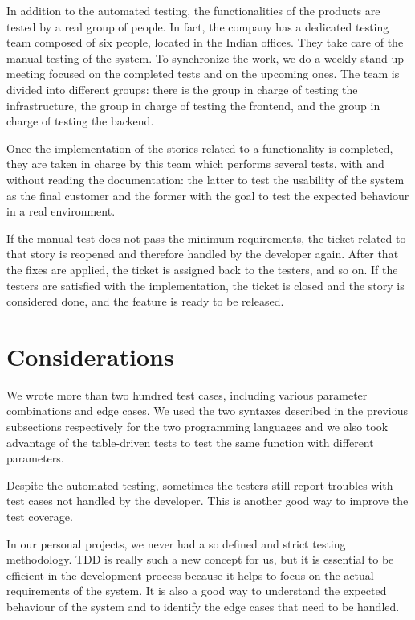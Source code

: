 In addition to the automated testing, the functionalities of the products are tested by a real group of people. In fact, the company has a dedicated testing team composed of six people, located in the Indian offices. They take care of the manual testing of the system. To synchronize the work, we do a weekly stand-up meeting focused on the completed tests and on the upcoming ones. The team is divided into different groups: there is the group in charge of testing the infrastructure, the group in charge of testing the frontend, and the group in charge of testing the backend.

Once the implementation of the stories related to a functionality is completed, they are taken in charge by this team which performs several tests, with and without reading the documentation: the latter to test the usability of the system as the final customer and the former with the goal to test the expected behaviour in a real environment.

If the manual test does not pass the minimum requirements, the ticket related to that story is reopened and therefore handled by the developer again. After that the fixes are applied, the ticket is assigned back to the testers, and so on. If the testers are satisfied with the implementation, the ticket is closed and the story is considered done, and the feature is ready to be released.

\section{Considerations}

We wrote more than two hundred test cases, including various parameter combinations and edge cases. We used the two syntaxes described in the previous subsections respectively for the two programming languages and we also took advantage of the table-driven tests to test the same function with different parameters.

Despite the automated testing, sometimes the testers still report troubles with test cases not handled by the developer. This is another good way to improve the test coverage.

In our personal projects, we never had a so defined and strict testing methodology. TDD is really such a new concept for us, but it is essential to be efficient in the development process because it helps to focus on the actual requirements of the system. It is also a good way to understand the expected behaviour of the system and to identify the edge cases that need to be handled.
